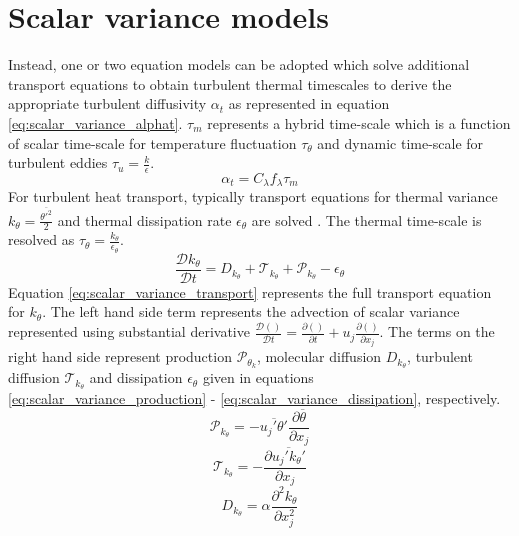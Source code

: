 \section{Scalar variance models}

Instead, one or two equation models can be adopted which solve additional transport equations to obtain turbulent thermal timescales to derive the appropriate turbulent diffusivity $\alpha_{t}$ as represented in equation \ref{eq:scalar_variance_alphat}. $\tau_{m}$ represents a hybrid time-scale which is a function of scalar time-scale for temperature fluctuation $\tau_{\theta}$ and dynamic time-scale for turbulent eddies $\tau_{u} = \frac{k}{\epsilon}$. 
\begin{equation}
\label{eq:scalar_variance_alphat}
\alpha_{t} = C_{\lambda}f_{\lambda}\tau_{m}
\end{equation}
For turbulent heat transport, typically transport equations for thermal variance $k_{\theta} =\frac{\overline{\theta'^{2}}}{2}$ and thermal dissipation rate $\epsilon_{\theta}$ are solved \cite{Launder2001}. The thermal time-scale is resolved as $\tau_{\theta} = \frac{k_{\theta}}{\epsilon_{\theta}}$. 
\begin{equation}
\label{eq:scalar_variance_transport}
\frac{\mathcal{D} k_{\theta}}{\mathcal{D} t} = D_{k_{\theta}} + \mathcal{T}_{k_{\theta}} + \mathcal{P}_{k_{\theta}} - \epsilon_{\theta}
\end{equation}
Equation \ref{eq:scalar_variance_transport} represents the full transport equation for $k_{\theta}$. The left hand side term represents the advection of scalar variance represented using substantial derivative $\frac{\mathcal{D} ()}{\mathcal{D} t} = \frac{\partial ()}{\partial t} + u_{j}\frac{\partial ()}{\partial x_{j}}$. The terms on the right hand side represent production $\mathcal{P}_{\theta_{k}}$, molecular diffusion $D_{k_{\theta}}$, turbulent diffusion $\mathcal{T}_{k_{\theta}}$ and dissipation $\epsilon_{\theta}$ given in equations \ref{eq:scalar_variance_production} - \ref{eq:scalar_variance_dissipation}, respectively.
\begin{equation}
\label{eq:scalar_variance_production}
\mathcal{P}_{k_{\theta}} = -\overline{u_{j}'\theta'}\frac{\partial \overline{\theta}}{\partial x_{j}}
\end{equation}
\begin{equation}
\label{eq:scalar_variance_tdiffusion}
\mathcal{T}_{k_{\theta}} = -\frac{\partial \overline{u_{j}'k_{\theta}'}}{\partial x_{j}}
\end{equation}
\begin{equation}
\label{eq:scalar_variance_diffusion}
D_{k_{\theta}} = \alpha\frac{\partial^{2} k_{\theta}}{\partial x_{j}^{2} }
\end{equation}
